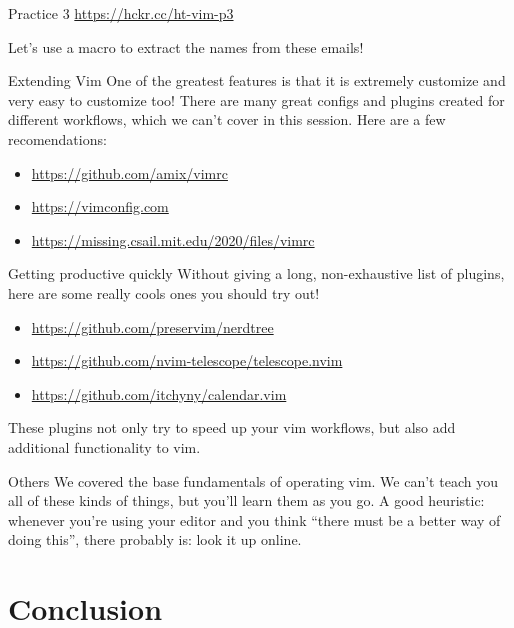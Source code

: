 \documentclass[12pt]{beamer}
\begin{document}
\begin{frame}{Practice 3}
    \url{https://hckr.cc/ht-vim-p3}

    Let's use a macro to extract the names from these emails!
\end{frame}{}

\begin{frame}{Extending Vim}
    One of the greatest features is that it is extremely customize and very easy to customize too!
    There are many great configs and plugins created for different workflows, which we can't cover in this
    session. Here are a few recomendations:

    \begin{itemize}
        \item \url{https://github.com/amix/vimrc}
        \item \url{https://vimconfig.com}
        \item \url{https://missing.csail.mit.edu/2020/files/vimrc}
    \end{itemize}{}
\end{frame}{}

\begin{frame}{Getting productive quickly}
   Without giving a long, non-exhaustive list of plugins, here are some really cools ones you should try out!
   \begin{itemize}
       \item \url{https://github.com/preservim/nerdtree}
       \item \url{https://github.com/nvim-telescope/telescope.nvim}
       \item \url{https://github.com/itchyny/calendar.vim}
   \end{itemize}
   These plugins not only try to speed up your vim workflows, but also add additional functionality to vim.
\end{frame}{}

\begin{frame}{Others}
    We covered the base fundamentals of operating vim. We can’t teach you all of these kinds of things, but you’ll learn them as you go. A good heuristic: whenever you’re using your editor and you think “there must be a better way of doing this”, there probably is: look it up online.
\end{frame}{}

\section{Conclusion}
\subsection{}
\end{document}
